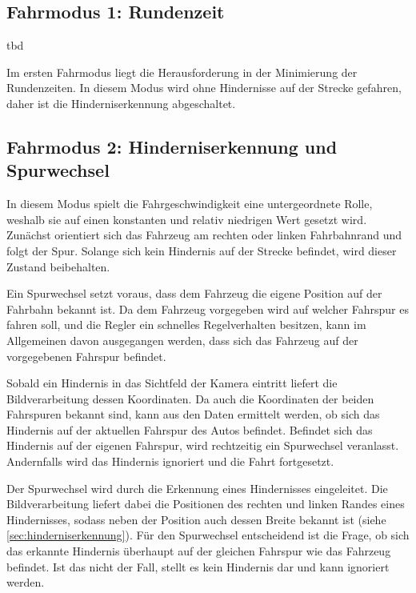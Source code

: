 \subsection{Fahrmodus 1: Rundenzeit}

tbd

Im ersten Fahrmodus liegt die Herausforderung in der Minimierung der Rundenzeiten. In diesem Modus wird ohne Hindernisse auf der Strecke gefahren, daher ist die Hinderniserkennung abgeschaltet.

\subsection{Fahrmodus 2: Hinderniserkennung und Spurwechsel}

In diesem Modus spielt die Fahrgeschwindigkeit eine untergeordnete Rolle, weshalb sie auf einen konstanten und relativ niedrigen Wert gesetzt wird. Zunächst orientiert sich das Fahrzeug am rechten oder linken Fahrbahnrand und folgt der Spur. Solange sich kein Hindernis auf der Strecke befindet, wird dieser Zustand beibehalten. 

Ein Spurwechsel setzt voraus, dass dem Fahrzeug die eigene Position auf der Fahrbahn bekannt ist. Da dem Fahrzeug vorgegeben wird auf welcher Fahrspur es fahren soll, und die Regler ein schnelles Regelverhalten besitzen, kann im Allgemeinen davon ausgegangen werden, dass sich das Fahrzeug auf der vorgegebenen Fahrspur befindet.

Sobald ein Hindernis in das Sichtfeld der Kamera eintritt liefert die Bildverarbeitung dessen Koordinaten. Da auch die Koordinaten der beiden Fahrspuren bekannt sind, kann aus den Daten ermittelt werden, ob sich das Hindernis auf der aktuellen Fahrspur des Autos befindet. Befindet sich das Hindernis auf der eigenen Fahrspur, wird rechtzeitig ein Spurwechsel veranlasst. Andernfalls wird das Hindernis ignoriert und die Fahrt fortgesetzt.

Der Spurwechsel wird durch die Erkennung eines Hindernisses eingeleitet. Die Bildverarbeitung liefert dabei die Positionen des rechten und linken Randes eines Hindernisses, sodass neben der Position auch dessen Breite bekannt ist (siehe \ref{sec:hinderniserkennung}). Für den Spurwechsel entscheidend ist die Frage, ob sich das erkannte Hindernis überhaupt auf der gleichen Fahrspur wie das Fahrzeug befindet. Ist das nicht der Fall, stellt es kein Hindernis dar und kann ignoriert werden.


